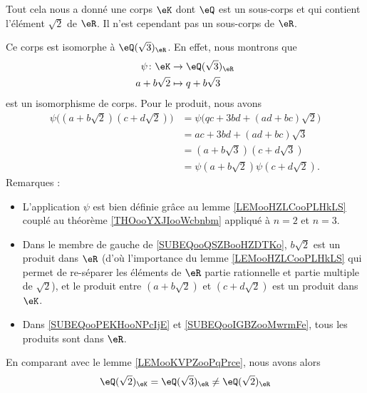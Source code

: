 \begin{example}
    Tout cela nous a donné une corps \( \eK\) dont \( \eQ\) est un sous-corps et qui contient l'élément \( \sqrt{ 2 }\) de \( \eR\). Il n'est cependant pas un sous-corps de \( \eR\).

    Ce corps est isomorphe à \( \eQ(\sqrt{ 3 })_{\eR}\). En effet, nous montrons que
    \begin{equation}
        \begin{aligned}
            \psi\colon \eK&\to \eQ(\sqrt{ 3 })_{\eR} \\
            a+b\sqrt{ 2 }&\mapsto q+b\sqrt{ 3 } 
        \end{aligned}
    \end{equation}
    est un isomorphisme de corps. Pour le produit, nous avons
    \begin{subequations}
        \begin{align}
            \psi\big( (a+b\sqrt{ 2 })(c+d\sqrt{ 2 }) \big)&=\psi\big( qc+3bd+(ad+bc)\sqrt{ 2 } \big) \label{SUBEQooQSZBooHZDTKo}\\
            &=ac+3bd+(ad+bc)\sqrt{ 3 }\label{SUBEQooPEKHooNPcIjE}\\
            &=(a+b\sqrt{ 3 })(c+d\sqrt{ 3 })\label{SUBEQooIGBZooMwrmFe}\\
            &=\psi(a+b\sqrt{ 2 })\psi(c+d\sqrt{ 2 }).
        \end{align}
    \end{subequations}
    Remarques :
    \begin{itemize}
        \item L'application \( \psi\) est bien définie grâce au lemme \ref{LEMooHZLCooPLHkLS} couplé au théorème \ref{THOooYXJIooWcbnbm} appliqué à \( n=2\) et \( n=3\).
        \item Dans le membre de gauche de \eqref{SUBEQooQSZBooHZDTKo}, \( b\sqrt{ 2 }\) est un produit dans \( \eR\) (d'où l'importance du lemme \ref{LEMooHZLCooPLHkLS} qui permet de re-séparer les éléments de \( \eR\) partie rationnelle et partie multiple de \( \sqrt{ 2 }\)), et le produit entre \( (a+b\sqrt{ 2 })\) et \( (c+d\sqrt{ 2 })\) est un produit dans \( \eK\).
        \item
            Dans \eqref{SUBEQooPEKHooNPcIjE} et \eqref{SUBEQooIGBZooMwrmFe}, tous les produits sont dans \( \eR\).
    \end{itemize}

    En comparant avec le lemme \ref{LEMooKVPZooPqPrce}, nous avons alors
    \begin{equation}
        \eQ(\sqrt{ 2 })_\eK=\eQ(\sqrt{ 3 })_\eR\neq \eQ(\sqrt{ 2 })_{\eR}
    \end{equation}
\end{example}

